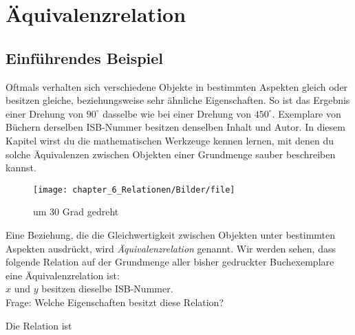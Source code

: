 


\section{Äquivalenzrelation}

\subsection{Einführendes Beispiel}
Oftmals verhalten sich verschiedene Objekte in bestimmten Aspekten gleich oder besitzen gleiche, beziehungsweise sehr ähnliche Eigenschaften. So ist das Ergebnis einer Drehung von $90^\circ$ dasselbe wie bei einer Drehung von $450^\circ$. Exemplare von Büchern derselben ISB-Nummer besitzen denselben Inhalt und Autor. In diesem Kapitel wirst du die mathematischen Werkzeuge kennen lernen, mit denen du solche Äquivalenzen zwischen Objekten einer Grundmenge sauber beschreiben kannst.


\begin{figure}[ht]
    \centering
    \texttt{[image: chapter\_6\_Relationen/Bilder/file]}
    \caption{um 30 Grad gedreht}
    \label{fig1}
\end{figure}


Eine Beziehung, die die Gleichwertigkeit zwischen Objekten unter bestimmten Aspekten ausdrückt, wird \textit{Äquivalenzrelation} genannt. Wir werden sehen, dass folgende Relation auf der Grundmenge aller bisher gedruckter Buchexemplare eine Äquivalenzrelation ist:\\
\noindent\hspace*{10mm}$x$ und $y$ besitzen dieselbe ISB-Nummer.\\

Frage: Welche Eigenschaften besitzt diese Relation?

Die Relation ist

